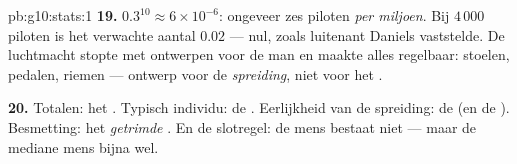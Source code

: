 \begin{solution}{pb:g10:stats:1}
\textbf{19.} $0.3^{10} \approx 6 \times 10^{-6}$: ongeveer zes piloten
\emph{per miljoen}. Bij $4\,000$ piloten is het verwachte aantal $0.02$ ---
nul, zoals luitenant Daniels vaststelde. De luchtmacht stopte met ontwerpen
voor de  man en maakte alles regelbaar: stoelen, pedalen, riemen
--- ontwerp voor de \emph{spreiding}, niet voor het .

\textbf{20.} Totalen: het \emph{}. Typisch individu: de
\emph{}. Eerlijkheid van de spreiding: de \emph{} (en de
). Besmetting: het \emph{getrimde }. En de
slotregel: de  mens bestaat niet --- maar de mediane mens bijna
wel.
\end{solution}

